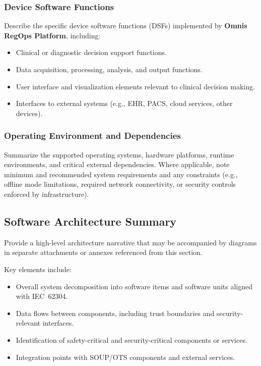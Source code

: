 \documentclass[11pt]{article}
\begin{document}
\subsubsection{Device Software Functions}
Describe the specific device software functions (DSFs) implemented by
\textbf{Omnis RegOps Platform}, including:
\begin{itemize}
    \item Clinical or diagnostic decision support functions.
    \item Data acquisition, processing, analysis, and output functions.
    \item User interface and visualization elements relevant to clinical decision
          making.
    \item Interfaces to external systems (e.g., EHR, PACS, cloud services,
          other devices).
\end{itemize}

\subsubsection{Operating Environment and Dependencies}
Summarize the supported operating systems, hardware platforms, runtime
environments, and critical external dependencies. Where applicable, note
minimum and recommended system requirements and any constraints (e.g., offline
mode limitations, required network connectivity, or security controls enforced
by infrastructure).

\subsection{Software Architecture Summary}
Provide a high-level architecture narrative that may be accompanied by diagrams
in separate attachments or annexes referenced from this section.

Key elements include:
\begin{itemize}
    \item Overall system decomposition into software items and software units
          aligned with IEC~62304.
    \item Data flows between components, including trust boundaries and
          security-relevant interfaces.
    \item Identification of safety-critical and security-critical components or
          services.
    \item Integration points with SOUP/OTS components and external services.
\end{itemize}
\end{document}
